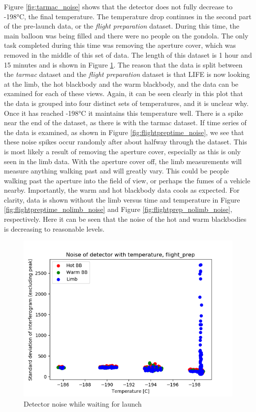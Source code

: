 Figure \ref{fig:tarmac_noise} shows that the detector does not fully decrease to -198°C, the final temperature. The temperature drop continues in the second part of the pre-launch data, or the \textit{flight preparation} dataset. During this time, the main balloon was being filled and there were no people on the gondola. The only task completed during this time was removing the aperture cover, which was removed in the middle of this set of data. The length of this dataset is 1 hour and 15 minutes and is shown in Figure \ref{fig:flightprep_noise}. The reason that the data is split between the \textit{tarmac} dataset and the \textit{flight preparation} dataset is that LIFE is now looking at the limb, the hot blackbody and the warm blackbody, and the data can be examined for each of these views. Again, it can be seen clearly in this plot that the data is grouped into four distinct sets of temperatures, and it is unclear why. Once it has reached -198°C it maintains this temperature well. There is a spike near the end of the dataset, as there is with the tarmac dataset. If  time series of the data is examined, as shown in Figure \ref{fig:flightpreptime_noise}, we see that these noise spikes occur randomly after about halfway through the dataset. This is most likely a result of removing the aperture cover, especially as this is only seen in the limb data. With the aperture cover off, the limb measurements will measure anything walking past and will greatly vary. This could be people walking past the aperture into the field of view, or perhaps the fumes of a vehicle nearby. Importantly, the warm and hot blackbody data cools as expected. For clarity, data is shown without the limb versus time and temperature in Figure \ref{fig:flightpreptime_nolimb_noise} and Figure \ref{fig:flightprep_nolimb_noise}, respectively. Here it can be seen that the noise of the hot and warm blackbodies is decreasing to reasonable levels.

\begin{figure}
  \centering
  \includegraphics[width=0.8\linewidth]{mct_noise_temp_plots/flight_prep_noisevstemp_invertedx_colours.png}
  \caption{Detector noise while waiting for launch}
  \label{fig:flightprep_noise}
\end{figure}

